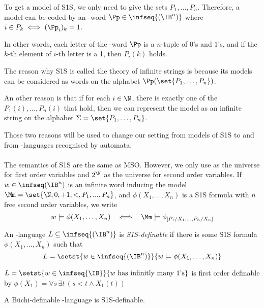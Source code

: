 \begin{remark}
To get a model of S1S, we only need to give the sets $P_1, \dots, P_n$.
Therefore, a model can be coded by an \w-word $\Pp \in \infseq{(\IB^n)}$
where $i \in P_k \iff (\Pp_i)_k = 1$.

In other words, each letter of the \w-word $\Pp$ is a $n$-tuple of
$0$'s and $1$'s, and if the $k$-th element of $i$-th letter is a 1,
then $P_i(k)$ holds.
\end{remark}

The reason why S1S is called the theory of infinite strings
is because its models can be considered as words on the
alphabet $\Pp(\set{P_1, \dots, P_n})$.

An other reason is that
if for each $i \in \N$, there is exactly
one of the $P_1(i), \dots, P_n(i)$ that hold, then
we can represent the model as an infinite string
on the alphabet $\Sigma = \set{P_1, \dots, P_n}$.

Those two reasons will be used to change our setting from
models of S1S to and from \w-languages recognised by automata.

\paragraph{}
The semantics of S1S are the same as MSO. However,
we only use \N as the universe for first order variables
and $2^\N$ as the universe for second order variables.
If $w \in \infiniteWords$ is an infinite word inducing
the model $\Mm = \set{\N, 0, +1, <, P_1, ..., P_n}$,
and $\phi(X_1, \dots, X_n)$
is a S1S formula with $n$ free second order variables,
we write \[
    w \models \phi(X_1, \dots, X_n)
    ~~\iff~~
    \Mm \models \phi_{[P_1/X_1, \dots, P_n/X_n]}
\]

\begin{definition}
    An \w-language $L \subseteq \infseq{(\IB^n)}$ is
    \emph{S1S-definable} if there is some S1S formula
    $\phi(X_1, \dots, X_n)$ such that
\[
    L = \setst{w \in \infseq{(\IB^n)}}{
        w \models \phi(X_1, \dots, X_n)
    }
\]
\end{definition}

\begin{example}
    $L = \setst{w \in \infseq{\IB}}{w \text{ has infinitly many 1's}}$
    is first order definable by
    $\phi(X_1) = \forall s\, \exists t\, (s < t \wedge X_1(t))$
\end{example}



\begin{lemma}\label{lemma:buchi-definable}
    A Büchi-definable \w-language is S1S-definable.
\end{lemma}

